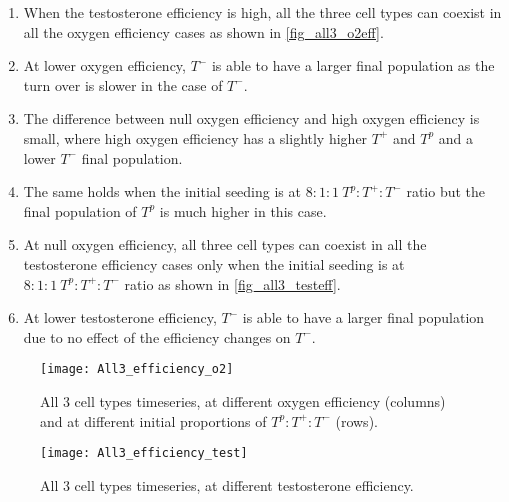 \begin{enumerate}
  \item When the testosterone efficiency is high, all the three cell types can coexist in all the oxygen efficiency cases as shown in \autoref{fig_all3_o2eff}.
  \item At lower oxygen efficiency, $T^-$ is able to have a larger final population as the turn over is slower in the case of $T^-$.
  \item The difference between null oxygen efficiency and high oxygen efficiency is small, where high oxygen efficiency has a slightly higher $T^+$ and $T^p$ and a lower $T^-$ final population.
  \item The same holds when the initial seeding is at $8:1:1\ T^p:T^+:T^-$ ratio but the final population of $T^p$ is much higher in this case.
  \item At null oxygen efficiency, all three cell types can coexist in all the testosterone efficiency cases only when the initial seeding is at $8:1:1\ T^p:T^+:T^-$ ratio as shown in \autoref{fig_all3_testeff}.
  \item At lower testosterone efficiency, $T^-$ is able to have a larger final population due to no effect of the efficiency changes on $T^-$.
\end{enumerate}

\begin{figure}[h!]
\centering
\texttt{[image: All3\_efficiency\_o2]}
\caption[All 3 cell types timeseries, oxygen efficiency]{All 3 cell types timeseries, at different oxygen efficiency (columns) and at different initial proportions of $T^p:T^+:T^-$ (rows).}
\label{fig_all3_o2eff}
\end{figure}

\begin{figure}[h!]
  \centering
  \texttt{[image: All3\_efficiency\_test]}
  \caption[All 3 cell types timeseries, testosterone efficiency]{All 3 cell types timeseries, at different testosterone efficiency.}
  \label{fig_all3_testeff}
\end{figure}

